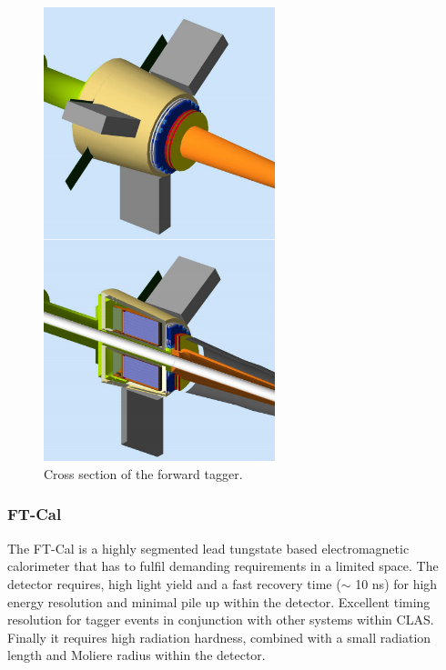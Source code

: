 \begin{figure}
	\centering
	\includegraphics[width=0.6\textwidth]{ImgChap1/FTcross}
	\caption{Cross section of the forward tagger. \cite{FTTDR2012} }
	\label{FTcross}
\end{figure}




\subsubsection{FT-Cal}
The FT-Cal is a highly segmented lead tungstate based electromagnetic calorimeter that has to fulfil demanding requirements in a limited space. The detector requires, high light yield and a fast recovery time ($\sim$ 10 ns) for high energy resolution and minimal pile up within the detector. Excellent timing resolution for tagger events in conjunction with other systems within CLAS. Finally it requires high radiation hardness, combined with a small radiation length and Moliere radius within the detector.

